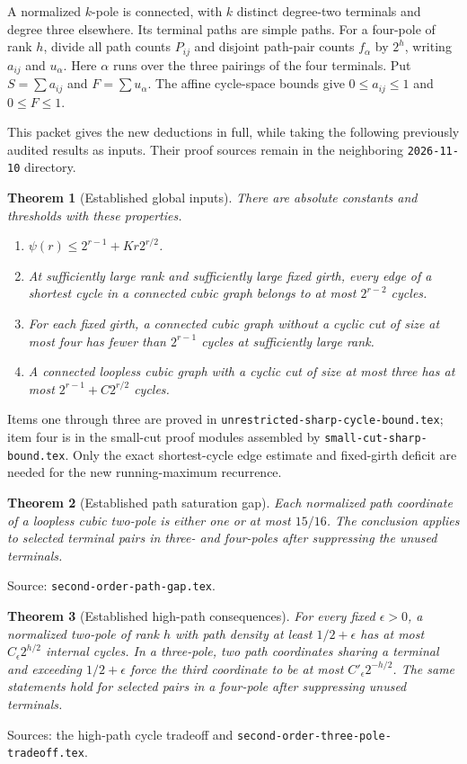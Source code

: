 \documentclass[11pt]{article}
\newtheorem{theorem}{Theorem}[section]
\begin{document}
A normalized $k$-pole is connected, with $k$ distinct degree-two terminals and degree three elsewhere.
Its terminal paths are simple paths.
For a four-pole of rank $h$, divide all path counts $P_{ij}$ and disjoint path-pair counts $f_\alpha$ by $2^h$, writing $a_{ij}$ and $u_\alpha$.
Here $\alpha$ runs over the three pairings of the four terminals.
Put $S=\sum a_{ij}$ and $F=\sum u_\alpha$.
The affine cycle-space bounds give $0\le a_{ij}\le1$ and $0\le F\le1$.

This packet gives the new deductions in full, while taking the following previously audited results as inputs.
Their proof sources remain in the neighboring \nolinkurl{2026-11-10} directory.

\begin{theorem}[Established global inputs]
\label{thm:exact-packet-global-inputs}
There are absolute constants and thresholds with these properties.
\begin{enumerate}
\item $\psi(r)\le2^{r-1}+Kr2^{r/2}$.
\item At sufficiently large rank and sufficiently large fixed girth, every edge of a shortest cycle in a connected cubic graph belongs to at most $2^{r-2}$ cycles.
\item For each fixed girth, a connected cubic graph without a cyclic cut of size at most four has fewer than $2^{r-1}$ cycles at sufficiently large rank.
\item A connected loopless cubic graph with a cyclic cut of size at most three has at most $2^{r-1}+C2^{r/2}$ cycles.
\end{enumerate}
\end{theorem}

Items one through three are proved in \nolinkurl{unrestricted-sharp-cycle-bound.tex}; item four is in the small-cut proof modules assembled by \nolinkurl{small-cut-sharp-bound.tex}.
Only the exact shortest-cycle edge estimate and fixed-girth deficit are needed for the new running-maximum recurrence.

\begin{theorem}[Established path saturation gap]
\label{thm:terminal-path-saturation-gap}
Each normalized path coordinate of a loopless cubic two-pole is either one or at most $15/16$.
The conclusion applies to selected terminal pairs in three- and four-poles after suppressing the unused terminals.
\end{theorem}
Source: \nolinkurl{second-order-path-gap.tex}.

\begin{theorem}[Established high-path consequences]
\label{thm:three-pole-two-high}
For every fixed $\epsilon>0$, a normalized two-pole of rank $h$ with path density at least $1/2+\epsilon$ has at most $C_\epsilon2^{h/2}$ internal cycles.
In a three-pole, two path coordinates sharing a terminal and exceeding $1/2+\epsilon$ force the third coordinate to be at most $C'_\epsilon2^{-h/2}$.
The same statements hold for selected pairs in a four-pole after suppressing unused terminals.
\end{theorem}
Sources: the high-path cycle tradeoff and \nolinkurl{second-order-three-pole-tradeoff.tex}.
\end{document}
